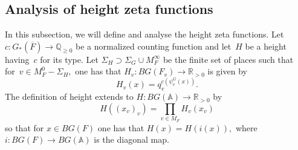 \documentclass[a4paper,english,12pt]{amsart}
\newcommand{\QQ}{\mathbb{Q}}
\newcommand{\RR}{\mathbb{R}}
\newcommand{\oF}{\overline F}
\newcommand{\vMF}{v\in M_F}
\newcommand{\AAA}{\mathbb A}
\newcommand{\wchi}{\widetilde{\chi}}
\DeclareMathOperator{\Frob}{Frob}
\DeclareMathOperator\et{\acute et}
\numberwithin{equation}{subsection}
\begin{document}
%
\subsection{Analysis of height zeta functions}\label{Fouriertransformsa} In this subsection, we will define and analyse the height zeta functions. %
Let $c:G_*(\oF)\to\QQ_{\geq 0}$ be a normalized counting function and let~$H$ be a height having~$c$ for its type. Let $\Sigma_H\supset \Sigma_G\cup M_F^{\infty}$ be the finite set of places such that for~$v\in M_F^0-\Sigma_H,$ one has that $H_v:BG(F_v)\to \RR_{>0}$ is given by$$H_v(x)=q_v^{c(\psi^G_v(x))}.$$ %
The definition of height extends to $H:BG(\AAA)\to \RR_{>0}$ by $$H((x_v)_v)=\prod_{\vMF}H_v(x_v)$$so that for $x\in BG(F)$ one has that $H(x)=H(i(x)),$ where $i:BG(F)\to BG(\AAA)$ is the diagonal map. 
\end{document}
